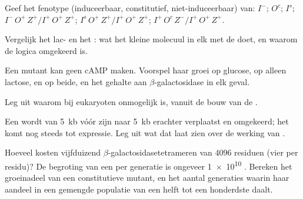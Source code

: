 \begin{exercise}[$\star\star$]\label{exo:b1:expression-control:5}
Geef het fenotype (induceerbaar, constitutief, niet-induceerbaar) van: $I^-$;
$O^c$; $I^s$; $I^-\,O^+\,Z^+ / I^+\,O^+\,Z^+$; $I^s\,O^+\,Z^+ /
I^+\,O^+\,Z^+$; $I^+\,O^c\,Z^- / I^+\,O^+\,Z^+$.
\end{exercise}

\begin{exercise}[$\star\star$]\label{exo:b1:expression-control:6}
Vergelijk het lac- en het : wat het kleine molecuul in elk met de
 doet, en waarom de logica omgekeerd is.
\end{exercise}

\begin{exercise}[$\star\star$]\label{exo:b1:expression-control:7}
Een mutant kan geen cAMP maken. Voorspel haar groei op glucose, op alleen lactose,
en op beide, en het gehalte aan $\beta$-galactosidase in elk geval.
\end{exercise}

\begin{exercise}[$\star\star$]\label{exo:b1:expression-control:8}
Leg uit waarom  bij eukaryoten onmogelijk is, vanuit de bouw van de
.
\end{exercise}

\begin{exercise}[$\star\star$]\label{exo:b1:expression-control:9}
Een  wordt van \qty{5}{kb} vóór zijn  naar \qty{5}{kb} erachter
verplaatst en omgekeerd; het  komt nog steeds tot expressie. Leg uit wat dat
laat zien over de werking van .
\end{exercise}

\begin{exercise}[$\star\star\star$]\label{exo:b1:expression-control:10}
Hoeveel  kosten vijfduizend $\beta$-galactosidasetetrameren van \qty{4096}{}
residuen (vier per residu)? De begroting van een  per generatie is ongeveer
\qty{1e10}{} . Bereken het groeinadeel van een constitutieve mutant, en het
aantal generaties waarin haar aandeel in een gemengde populatie van een helft tot
een honderdste daalt.
\end{exercise}

